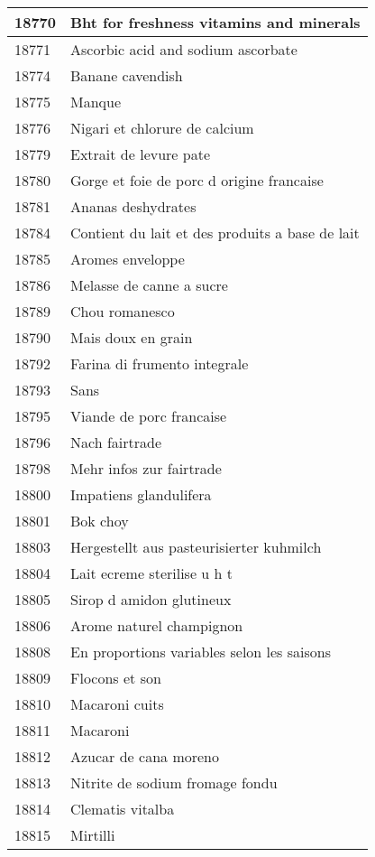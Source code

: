 \begin{longtable}{|l|l|}
18770 & Bht for freshness vitamins and minerals \\ \hline 
18771 & Ascorbic acid and sodium ascorbate \\ \hline 
18774 & Banane cavendish \\ \hline 
18775 & Manque \\ \hline 
18776 & Nigari et chlorure de calcium \\ \hline 
18779 & Extrait de levure pate \\ \hline 
18780 & Gorge et foie de porc d origine francaise \\ \hline 
18781 & Ananas deshydrates \\ \hline 
18784 & Contient du lait et des produits a base de lait \\ \hline 
18785 & Aromes enveloppe \\ \hline 
18786 & Melasse de canne a sucre \\ \hline 
18789 & Chou romanesco \\ \hline 
18790 & Mais doux en grain \\ \hline 
18792 & Farina di frumento integrale \\ \hline 
18793 & Sans \\ \hline 
18795 & Viande de porc francaise \\ \hline 
18796 & Nach fairtrade \\ \hline 
18798 & Mehr infos zur fairtrade \\ \hline 
18800 & Impatiens glandulifera \\ \hline 
18801 & Bok choy \\ \hline 
18803 & Hergestellt aus pasteurisierter kuhmilch \\ \hline 
18804 & Lait ecreme sterilise u h t \\ \hline 
18805 & Sirop d amidon glutineux \\ \hline 
18806 & Arome naturel champignon \\ \hline 
18808 & En proportions variables selon les saisons \\ \hline 
18809 & Flocons et son \\ \hline 
18810 & Macaroni cuits \\ \hline 
18811 & Macaroni \\ \hline 
18812 & Azucar de cana moreno \\ \hline 
18813 & Nitrite de sodium fromage fondu \\ \hline 
18814 & Clematis vitalba \\ \hline 
18815 & Mirtilli \\ \hline 

\end{longtable}
